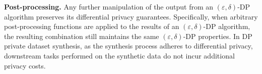 \documentclass{article}
\begin{document}
 

\noindent\textbf{Post-processing.} Any further manipulation of the output from an $(\varepsilon,\delta)$-DP algorithm preserves its differential privacy guarantees. Specifically, when arbitrary post-processing functions are applied to the results of an $(\varepsilon,\delta)$-DP algorithm, the resulting combination still maintains the same $(\varepsilon,\delta)$-DP properties. In DP private dataset synthesis, as the synthesis process adheres to differential privacy, downstream tasks performed on the synthetic data do not incur additional privacy costs.
\end{document}

